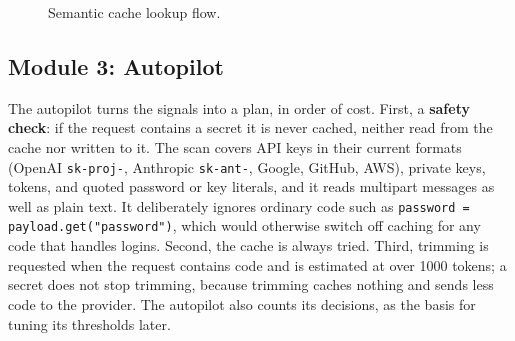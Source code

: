 \documentclass[12pt, a4paper, oneside]{report}
\newcommand{\code}[1]{\texttt{#1}}
\begin{document}
\begin{figure}[H]
\centering
{}
\caption{Semantic cache lookup flow.}
\label{fig:cache}
\end{figure}

\subsection{Module 3: Autopilot}

The autopilot turns the signals into a plan, in order of cost. First, a
\textbf{safety check}: if the request contains a secret it is never cached,
neither read from the cache nor written to it. The scan covers API keys in their
current formats (OpenAI \code{sk-proj-}, Anthropic \code{sk-ant-}, Google, GitHub,
AWS), private keys, tokens, and quoted password or key literals, and it reads
multipart messages as well as plain text. It deliberately ignores ordinary code
such as \code{password = payload.get("password")}, which would otherwise switch
off caching for any code that handles logins. Second, the cache is always tried.
Third, trimming is requested when the request contains code and is estimated at
over 1000 tokens; a secret does not stop trimming, because trimming caches nothing
and sends less code to the provider. The autopilot also counts its decisions, as
the basis for tuning its thresholds later.
\end{document}
